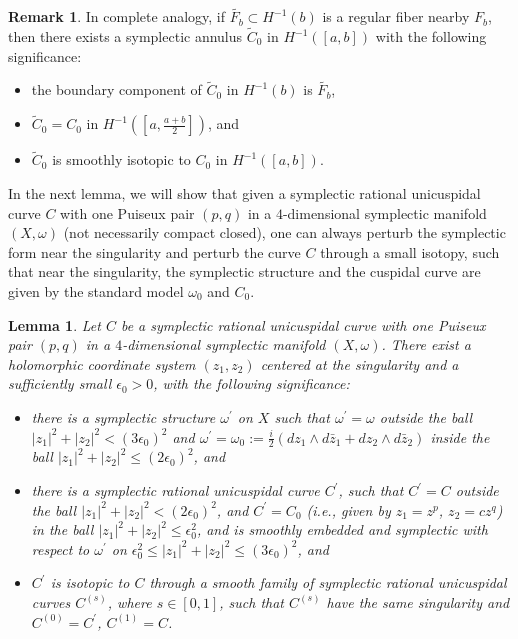 \documentclass[11pt]{amsart}
\theoremstyle{plain}
\numberwithin{theorem}{section}
\newtheorem{lemma}[theorem]{Lemma}
\theoremstyle{definition}
\newtheorem{remark}[theorem]{Remark}
\begin{document}
\begin{remark}
In complete analogy, if $\tilde{F_b}\subset H^{-1}(b)$ is a regular fiber nearby $F_b$, then there exists a 
symplectic annulus $\tilde{C}_0$ in $H^{-1}([a,b])$ with the following significance:
\begin{itemize}
\item [{(i)}] the boundary component of $\tilde{C}_0$ in $H^{-1}(b)$ is  $\tilde{F_b}$,
\item [{(ii)}] $\tilde{C}_0=C_0$ in  $H^{-1}([a, \frac{a+b}{2}])$, and 
\item [{(iii)}] $\tilde{C}_0$ is smoothly isotopic to $C_0$ in $H^{-1}([a,b])$. 
\end{itemize}
\end{remark}

In the next lemma, we will show that given a symplectic rational unicuspidal curve $C$ with one Puiseux pair
$(p,q)$ in a $4$-dimensional symplectic manifold $(X,\omega)$ (not necessarily compact closed), one can always perturb the symplectic form near the singularity and perturb the curve $C$ through a small isotopy, such that
near the singularity, the symplectic structure and the cuspidal curve are given by the standard model $\omega_0$
and $C_0$. 

\begin{lemma}
Let $C$ be a symplectic rational unicuspidal curve with one Puiseux pair $(p,q)$ in a $4$-dimensional symplectic manifold $(X,\omega)$. There exist a holomorphic coordinate system 
$(z_1,z_2)$ centered at the singularity and a sufficiently small  $\epsilon_0>0$, with the following significance:
\begin{itemize}
\item [{(1)}] there is a symplectic structure $\omega^\prime$ on $X$ such that $\omega^\prime=\omega$
outside the ball $|z_1|^2+|z_2|^2<(3\epsilon_0)^2$ and $\omega^\prime=\omega_0:=\frac{i}{2}(dz_1\wedge d\bar{z}_1+dz_2\wedge d\bar{z}_2)$ inside the ball $|z_1|^2+|z_2|^2\leq (2\epsilon_0)^2$, and 
\item [{(2)}] there is a symplectic rational unicuspidal curve $C^\prime$, such that $C^\prime=C$ outside the ball 
$|z_1|^2+|z_2|^2<(2\epsilon_0)^2$, and $C^\prime=C_0$ (i.e., given by $z_1=z^p$, $z_2=c z^q$) in the ball 
$|z_1|^2+|z_2|^2\leq \epsilon_0^2$, and is smoothly embedded and symplectic with respect to 
$\omega^\prime$ on $\epsilon_0^2\leq |z_1|^2+|z_2|^2\leq (3\epsilon_0)^2$, and
\item [{(3)}] $C^\prime$ is isotopic to $C$ through a smooth family of symplectic rational unicuspidal curves
$C^{(s)}$, where $s\in [0,1]$, such that $C^{(s)}$ have the same singularity and $C^{(0)}=C^\prime$, $C^{(1)} =C$.
\end{itemize}
\end{lemma}
\end{document}
